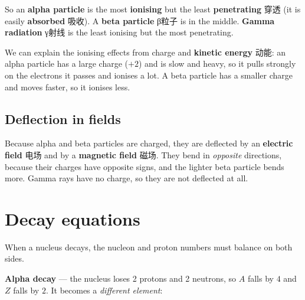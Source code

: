\documentclass[11pt]{article}
\begin{document}
\begin{center}
\end{center}

So an \textbf{alpha particle} is the most \textbf{ionising} but the least \textbf{penetrating} 穿透 (it is easily \textbf{absorbed} 吸收). A \textbf{beta particle} β粒子 is in the middle. \textbf{Gamma radiation} γ射线 is the least ionising but the most penetrating.

We can explain the ionising effects from charge and \textbf{kinetic energy} 动能: an alpha particle has a large charge ($+2$) and is slow and heavy, so it pulls strongly on the electrons it passes and ionises a lot. A beta particle has a smaller charge and moves faster, so it ionises less.

\subsection*{Deflection in fields}

Because alpha and beta particles are charged, they are deflected by an \textbf{electric field} 电场 and by a \textbf{magnetic field} 磁场. They bend in \emph{opposite} directions, because their charges have opposite signs, and the lighter beta particle bends more. Gamma rays have no charge, so they are not deflected at all.

\section*{Decay equations}

When a nucleus decays, the nucleon and proton numbers must balance on both sides.

\textbf{Alpha decay} — the nucleus loses 2 protons and 2 neutrons, so $A$ falls by $4$ and $Z$ falls by $2$. It becomes a \emph{different element}:
\end{document}
